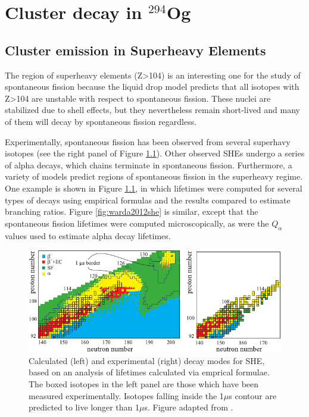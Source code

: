 \chapter{Cluster decay in $^{294}$Og}\label{chap:294Og}

\section{Cluster emission in Superheavy Elements}

The region of superheavy elements (Z>104) is an interesting one for the study of spontaneous fission because the liquid drop model predicts that all isotopes with Z>104 are unstable with respect to spontaneous fission. These nuclei are stabilized due to shell effects, but they nevertheless remain short-lived and many of them will decay by spontaneous fission regardless.

Experimentally, spontaneous fission has been observed from several superhavy isotopes (see the right panel of Figure \ref{fig:karpovshedecay}). Other observed SHEs undergo a series of alpha decays, which chains terminate in spontaneous fission. Furthermore, a variety of models predict regions of spontaneous fission in the superheavy regime. One example is shown in Figure \ref{fig:karpovshedecay}, in which lifetimes were computed for several types of decays using empirical formulas and the results compared to estimate branching ratios. Figure \ref{fig:warda2012she} is similar, except that the spontaneous fission lifetimes were computed microscopically, as were the $Q_\alpha$ values used to estimate alpha decay lifetimes.


\begin{figure}
	\centering
	\includegraphics[width=0.9\linewidth]{TeX_files/294Og_Karpov_SHEdecay}
	\caption[Calculated and experimental decay modes for SHE]{Calculated (left) and experimental (right) decay modes for SHE, based on an analysis of lifetimes calculated via emprical formulae. The boxed isotopes in the left panel are those which have been measured experimentally. Isotopes falling inside the 1$\mu$s contour are predicted to live longer than 1$\mu$s. Figure adapted from \cite{Karpova}.}
	\label{fig:karpovshedecay}
\end{figure}


